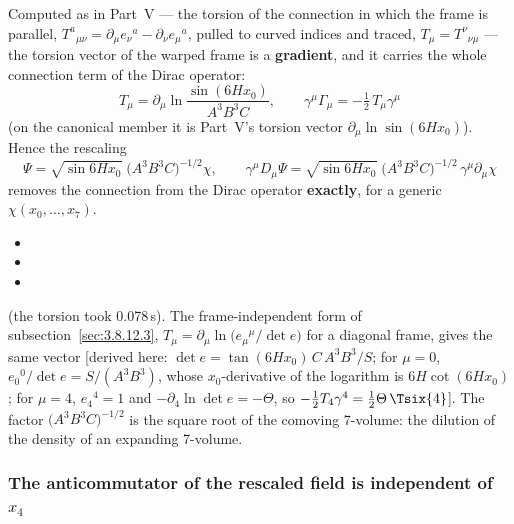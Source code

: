 Computed as in Part~V --- the torsion of the connection in which the frame is parallel,
$T^a{}_{\mu\nu}=\partial_\mu e_\nu{}^a-\partial_\nu e_\mu{}^a$, pulled to curved indices and traced,
$T_\mu=T^\nu{}_{\nu\mu}$ --- the torsion vector of the warped frame is a \textbf{gradient}, and it carries
the whole connection term of the Dirac operator:
\[
  T_\mu=\partial_\mu\ln\frac{\sin(6Hx_0)}{A^3B^3C},\qquad \gamma^\mu\Gamma_\mu=-\tfrac12\,T_\mu\gamma^\mu
\]
(on the canonical member it is Part~V's torsion vector $\partial_\mu\ln\sin(6Hx_0)$). Hence the rescaling
\[
  \Psi=\sqrt{\sin 6Hx_0}\;\bigl(A^3B^3C\bigr)^{-1/2}\chi,\qquad
  \gamma^\mu D_\mu\Psi=\sqrt{\sin 6Hx_0}\;\bigl(A^3B^3C\bigr)^{-1/2}\,\gamma^\mu\partial_\mu\chi
\]
removes the connection from the Dirac operator \textbf{exactly}, for a generic $\chi(x_0,\dots,x_7)$.
\begin{itemize}
  \item {}
  \item {}
  \item {}
\end{itemize}
(the torsion took 0.078\,s). The frame-independent form of subsection~\ref{sec:3.8.12.3},
$T_\mu=\partial_\mu\ln\bigl(e_\mu{}^\mu/\det e\bigr)$ for a diagonal frame, gives the same vector [derived
here: $\det e=\tan(6Hx_0)\,C\,A^3B^3/S$; for $\mu=0$, $e_0{}^0/\det e=S/(A^3B^3)$, whose $x_0$-derivative
of the logarithm is $6H\cot(6Hx_0)$; for $\mu=4$, $e_4{}^4=1$ and $-\partial_4\ln\det e=-\Theta$, so
$-\tfrac12T_4\gamma^4=\tfrac12\Theta\,\Tsix{4}$]. The factor $\bigl(A^3B^3C\bigr)^{-1/2}$ is the square root of
the comoving 7-volume: the dilution of the density of an expanding 7-volume.

\subsubsection{The anticommutator of the rescaled field is independent of \texorpdfstring{$x_4$}{x4}}
\label{sec:4.4.6}

